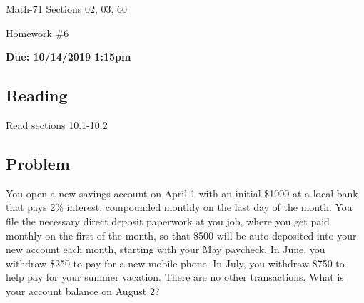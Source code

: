 \documentclass[letterpaper,12pt,fleqn]{article}
\begin{document}
\begin{center}
  \large
  Math-71 Sections 02, 03, 60

  \Large
  Homework \#6

  \large
  \textbf{Due: 10/14/2019 1:15pm}
\end{center}

\subsection*{Reading}

Read sections 10.1-10.2

\subsection*{Problem}

You open a new savings account on April 1 with an initial \$1000 at a local bank that pays 2\% interest, compounded
monthly on the last day of the month.  You file the necessary direct deposit paperwork at you job, where you get
paid monthly on the first of the month, so that \$500 will be auto-deposited into your new account each month,
starting with your May paycheck.  In June, you withdraw \$250 to pay for a new mobile phone.  In July, you withdraw
\$750 to help pay for your summer vacation.  There are no other transactions.  What is your account balance on
August 2?
\end{document}
